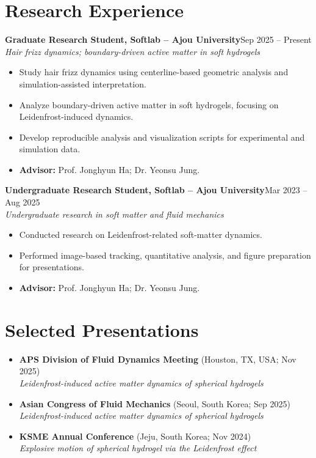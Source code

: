 \documentclass[a4paper,10pt]{article}
\newcommand{\entry}[4]{%
\textbf{#1}\hfill #2\\
\textit{#3}\hfill \textcolor{muted}{#4}\\[-2pt]
}
\begin{document}
\section*{Research Experience}
\entry{Graduate Research Student, Softlab -- Ajou University}{Sep 2025 -- Present}{Hair frizz dynamics; boundary-driven active matter in soft hydrogels}{}
\begin{itemize}
  \item Study hair frizz dynamics using centerline-based geometric analysis and simulation-assisted interpretation.
  \item Analyze boundary-driven active matter in soft hydrogels, focusing on Leidenfrost-induced dynamics.
  \item Develop reproducible analysis and visualization scripts for experimental and simulation data.
  \item \textbf{Advisor:} Prof. Jonghyun Ha; Dr. Yeonsu Jung.
\end{itemize}

\entry{Undergraduate Research Student, Softlab -- Ajou University}{Mar 2023 -- Aug 2025}{Undergraduate research in soft matter and fluid mechanics}{}
\begin{itemize}
  \item Conducted research on Leidenfrost-related soft-matter dynamics.
  \item Performed image-based tracking, quantitative analysis, and figure preparation for presentations.
  \item \textbf{Advisor:} Prof. Jonghyun Ha; Dr. Yeonsu Jung.
\end{itemize}

\section*{Selected Presentations}
\begin{itemize}
  \item \textbf{APS Division of Fluid Dynamics Meeting} (Houston, TX, USA; Nov 2025)\\
  \textit{Leidenfrost-induced active matter dynamics of spherical hydrogels}

  \item \textbf{Asian Congress of Fluid Mechanics} (Seoul, South Korea; Sep 2025)\\
  \textit{Leidenfrost-induced active matter dynamics of spherical hydrogels}

  \item \textbf{KSME Annual Conference} (Jeju, South Korea; Nov 2024)\\
  \textit{Explosive motion of spherical hydrogel via the Leidenfrost effect}
\end{itemize}
\end{document}
